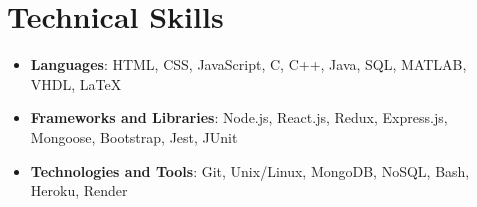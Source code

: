 \documentclass[letterpaper,11pt]{article}
\newcommand{\resumeItemUpdated}[1]{
  \item\small{
    {#1 \vspace{-7pt}}
  }
}
\newcommand{\resumeItemListStart}{\begin{itemize}[leftmargin=*]}
\newcommand{\resumeItemListEnd}{\end{itemize}\vspace{-5pt}}
\begin{document}
\section{Technical Skills}
   \resumeItemListStart
        \resumeItemUpdated
          {\textbf{Languages}{: HTML, CSS, JavaScript, C, C++, Java, SQL, MATLAB, VHDL, \LaTeX }}
        \resumeItemUpdated
          {\textbf{Frameworks and Libraries}{: Node.js, React.js, Redux, Express.js, Mongoose, Bootstrap, Jest, JUnit }}
        \resumeItemUpdated
          {\textbf{Technologies and Tools}{: Git, Unix/Linux, MongoDB, NoSQL, Bash, Heroku, Render}}
   \resumeItemListEnd


\end{document}
